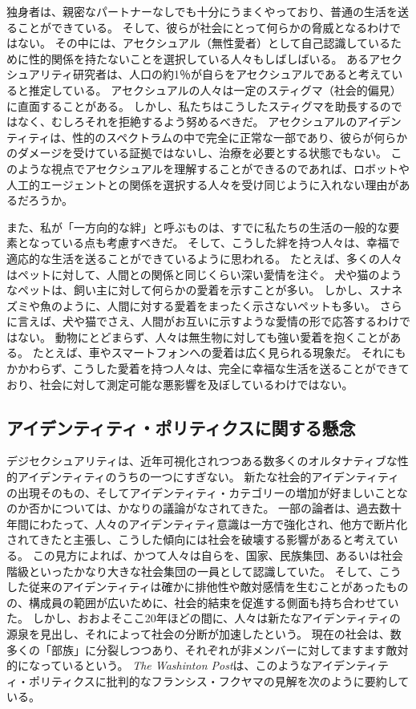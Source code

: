 \documentclass[paper=a4,book,openany]{jlreq}
\begin{document}
独身者は、親密なパートナーなしでも十分にうまくやっており、普通の生活を送ることができている。
そして、彼らが社会にとって何らかの脅威となるわけではない。
その中には、アセクシュアル（無性愛者）として自己認識しているために性的関係を持たないことを選択している人々もしばしばいる。
あるアセクシュアリティ研究者は、人口の約1％が自らをアセクシュアルであると考えていると推定している\citep{bogaert04:_asexual}。
アセクシュアルの人々は一定のスティグマ（社会的偏見）に直面することがある。
しかし、私たちはこうしたスティグマを助長するのではなく、むしろそれを拒絶するよう努めるべきだ。
アセクシュアルのアイデンティティは、性的のスペクトラムの中で完全に正常な一部であり、彼らが何らかのダメージを受けている証拠ではないし、治療を必要とする状態でもない。
このような視点でアセクシュアルを理解することができるのであれば、ロボットや人工的エージェントとの関係を選択する人々を受け同じように入れない理由があるだろうか。

また、私が「一方向的な絆」と呼ぶものは、すでに私たちの生活の一般的な要素となっている点も考慮すべきだ。
そして、こうした絆を持つ人々は、幸福で適応的な生活を送ることができているように思われる。
たとえば、多くの人々はペットに対して、人間との関係と同じくらい深い愛情を注ぐ。
犬や猫のようなペットは、飼い主に対して何らかの愛着を示すことが多い。
しかし、スナネズミや魚のように、人間に対する愛着をまったく示さないペットも多い。
さらに言えば、犬や猫でさえ、人間がお互いに示すような愛情の形で応答するわけではない。
動物にとどまらず、人々は無生物に対しても強い愛着を抱くことがある。
たとえば、車やスマートフォンへの愛着は広く見られる現象だ。
それにもかかわらず、こうした愛着を持つ人々は、完全に幸福な生活を送ることができており、社会に対して測定可能な悪影響を及ぼしているわけではない。

\subsection{アイデンティティ・ポリティクスに関する懸念}

デジセクシュアリティは、近年可視化されつつある数多くのオルタナティブな性的アイデンティティのうちの一つにすぎない。
新たな社会的アイデンティティの出現そのもの、そしてアイデンティティ・カテゴリーの増加が好ましいことなのか否かについては、かなりの議論がなされてきた。
一部の論者は、過去数十年間にわたって、人々のアイデンティティ意識は一方で強化され、他方で断片化されてきたと主張し、こうした傾向には社会を破壊する影響があると考えている。
この見方によれば、かつて人々は自らを、国家、民族集団、あるいは社会階級といったかなり大きな社会集団の一員として認識していた。
そして、こうした従来のアイデンティティは確かに排他性や敵対感情を生むことがあったものの、構成員の範囲が広いために、社会的結束を促進する側面も持ち合わせていた。
しかし、おおよそここ20年ほどの間に、人々は新たなアイデンティティの源泉を見出し、それによって社会の分断が加速したという。
現在の社会は、数多くの「部族」に分裂しつつあり、それぞれが非メンバーに対してますます敵対的になっているという。
\emph{The Washinton Post}は、このようなアイデンティティ・ポリティクスに批判的なフランシス・フクヤマの見解を次のように要約している。
\end{document}
